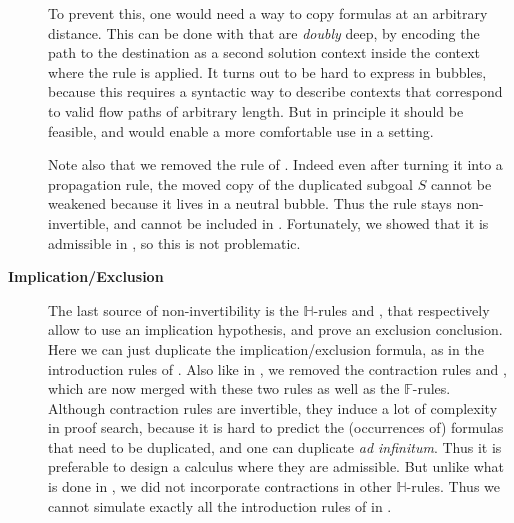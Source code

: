 \begin{description}
    To prevent this, one would need a way to copy formulas at an arbitrary
    distance. This can be done with  that are \emph{doubly} deep,
    by encoding the path to the destination as a second solution context inside
    the context where the rule is applied. It turns out
    to be hard to express in bubbles, because this requires a syntactic way to
    describe contexts that correspond to valid flow paths of arbitrary
    length. But in
    principle it should be feasible, and would enable a more comfortable use in
    a  setting.

    Note also that we removed the  rule of .
    Indeed even after turning it into a propagation rule, the moved copy of the
    duplicated subgoal $S$ cannot be weakened because it lives in a neutral
    bubble. Thus the rule stays non-invertible, and cannot be included in
    . Fortunately, we showed that it is admissible in
    , so this is not problematic.

  \item[\textbf{Implication/Exclusion}]
    The last source of non-invertibility is the $\mathbb{H}$-rules
    \rsf{{\limp}{-}} and \rsf{{\lsub}{+}}, that respectively allow to use an
    implication hypothesis, and prove an exclusion conclusion.
    Here we can just duplicate the implication/exclusion formula, as in the
    introduction rules of . Also like in , we removed
    the contraction rules  and , which are now merged with
    these two rules as well as the $\mathbb{F}$-rules. Although contraction
    rules are invertible, they induce a lot of complexity in proof search,
    because it is hard to predict the (occurrences of) formulas that need to be
    duplicated, and one can duplicate \emph{ad infinitum}. Thus it is preferable
    to design a calculus where they are admissible. But unlike what is done in
    , we did not incorporate contractions in other
    $\mathbb{H}$-rules. Thus we cannot simulate exactly all the introduction
    rules of  in .

\end{description}


